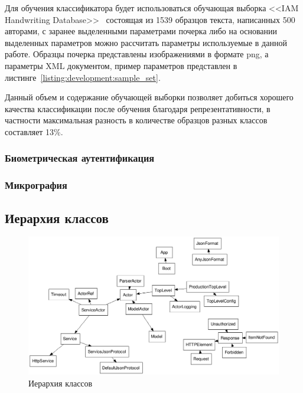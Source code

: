 

Для обучения классификатора будет использоваться обучающая выборка <<IAM Handwriting Database>>~\cite{IAM_handwriting_database} состоящая из 1539 образцов текста, написанных 500 авторами, с заранее выделенными параметрами почерка либо на основании выделенных параметров можно рассчитать параметры используемые в данной работе. Образцы почерка представлены изображениями в формате png, а параметры XML документом, пример параметров представлен в листинге~\ref{listing:development:sample_set}.


Данный объем и содержание обучающей выборки позволяет добиться хорошего качества классификации после обучения благодаря репрезентативности, в частности максимальная разность в количестве образцов разных классов составляет 13\%.

\subsubsection{Биометрическая аутентификация}
\subsubsection{Микрография}

\subsection{Иерархия классов}
\begin{figure}[!ht]
    \centering
    \includegraphics[width=1\textwidth]{figures/classes-fdp.png}
    \caption{Иерархия классов}
    \label{fig:develoipment:class_fdp}
\end{figure}

